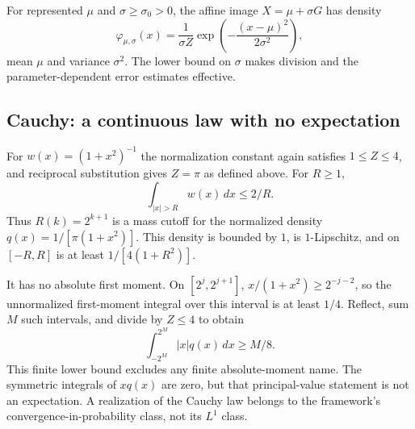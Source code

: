 For represented $\mu$ and $\sigma\geq\sigma_0>0$, the affine image
$X=\mu+\sigma G$ has density
\[
 \varphi_{\mu,\sigma}(x)=\frac1{\sigma Z}
       \exp\!\left(-\frac{(x-\mu)^2}{2\sigma^2}\right),
\]
mean $\mu$ and variance $\sigma^2$.  The lower bound on $\sigma$ makes
division and the parameter-dependent error estimates effective.

\subsection{Cauchy: a continuous law with no expectation}

For $w(x)=(1+x^2)^{-1}$ the normalization constant again satisfies
$1\leq Z\leq4$, and reciprocal substitution gives $Z=\pi$ as defined above.
For $R\geq1$,
\[
 \int_{|x|>R}w(x)\,dx\leq 2/R.
\]
Thus $R(k)=2^{k+1}$ is a mass cutoff for the normalized density
$q(x)=1/[\pi(1+x^2)]$.  This density is bounded by $1$, is $1$-Lipschitz,
and on $[-R,R]$ is at least $1/[4(1+R^2)]$.

It has no absolute first moment.  On
$[2^j,2^{j+1}]$, $x/(1+x^2)\geq2^{-j-2}$, so the unnormalized first-moment
integral over this interval is at least $1/4$.  Reflect, sum $M$ such
intervals, and divide by $Z\leq4$ to obtain
\[
 \int_{-2^M}^{2^M}|x|q(x)\,dx\geq M/8.
\]
This finite lower bound excludes any finite absolute-moment name.  The
symmetric integrals of $xq(x)$ are zero, but that principal-value statement
is not an expectation.  A realization of the Cauchy law belongs to the
framework's convergence-in-probability class, not its $L^1$ class.

